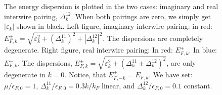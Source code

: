\begin{figure} 
\begin{center}  
  
\caption{The energy dispersion is plotted in the two cases: imaginary and real interwire pairing, $\Delta^{12}_k$. When both pairings are zero, we simply get $|\varepsilon_k|$ shown in black. Left figure, imaginary interwire pairing: in red: $E^{\pm}_{F,k} = \sqrt{\varepsilon^2_k + \left(\Delta^{11}_k\right)^2 + \left|\Delta^{12}_k\right|^2}$. The dispersions are completely degenerate. Right figure, real interwire pairing: In red: $E^{+}_{F,k}$. In blue: $E^{-}_{F,k}$. The dispersions, $E^{\pm}_{F,k} = \sqrt{\varepsilon_k^2 + \left(\Delta^{11}_k \pm \Delta^{12}_k\right)^2}$, are only degenerate in $k = 0$. Notice, that $E^{+}_{F,-k} = E^{-}_{F,k}$. We have set: $\mu / \epsilon_{F,0} = 1$, $\Delta^{11}_k / \epsilon_{F,0} = 0.3 k / k_F$ linear, and $\Delta^{12}_k / \epsilon_{F,0} = 0.1$ constant. }  
\label{fig.Dispersionexamples}  
\end{center}    
\end{figure}


